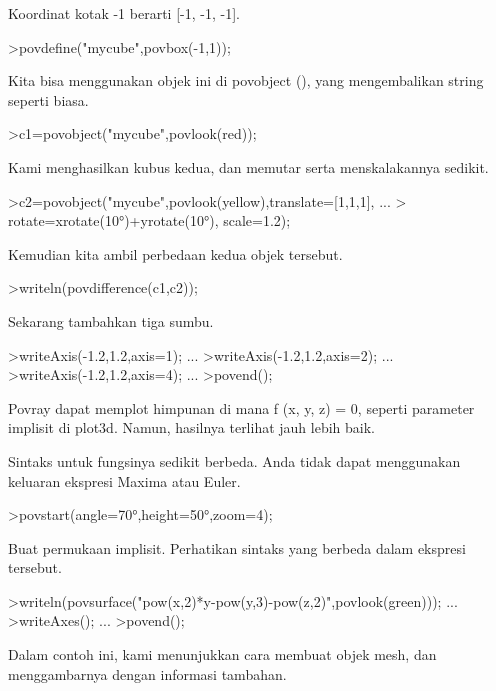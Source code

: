 \documentclass[a4paper,10pt]{article}
\begin{document}
\begin{eulernotebook}
\begin{eulercomment}
\begin{eulercomment}
\begin{eulercomment}
Koordinat kotak -1 berarti [-1, -1, -1].
\end{eulercomment}
\begin{eulerprompt}
>povdefine("mycube",povbox(-1,1));
\end{eulerprompt}
\begin{eulercomment}
Kita bisa menggunakan objek ini di povobject (), yang mengembalikan
string seperti biasa.
\end{eulercomment}
\begin{eulerprompt}
>c1=povobject("mycube",povlook(red));
\end{eulerprompt}
\begin{eulercomment}
Kami menghasilkan kubus kedua, dan memutar serta menskalakannya
sedikit.
\end{eulercomment}
\begin{eulerprompt}
>c2=povobject("mycube",povlook(yellow),translate=[1,1,1], ...
>  rotate=xrotate(10°)+yrotate(10°), scale=1.2);
\end{eulerprompt}
\begin{eulercomment}
Kemudian kita ambil perbedaan kedua objek tersebut.
\end{eulercomment}
\begin{eulerprompt}
>writeln(povdifference(c1,c2));
\end{eulerprompt}
\begin{eulercomment}
Sekarang tambahkan tiga sumbu.
\end{eulercomment}
\begin{eulerprompt}
>writeAxis(-1.2,1.2,axis=1); ...
>writeAxis(-1.2,1.2,axis=2); ...
>writeAxis(-1.2,1.2,axis=4); ...
>povend();
\end{eulerprompt}
\begin{eulercomment}
Povray dapat memplot himpunan di mana f (x, y, z) = 0, seperti
parameter implisit di plot3d. Namun, hasilnya terlihat jauh lebih
baik.

Sintaks untuk fungsinya sedikit berbeda. Anda tidak dapat menggunakan
keluaran ekspresi Maxima atau Euler.
\end{eulercomment}
\begin{eulerprompt}
>povstart(angle=70°,height=50°,zoom=4);
\end{eulerprompt}
\begin{eulercomment}
Buat permukaan implisit. Perhatikan sintaks yang berbeda dalam
ekspresi tersebut.
\end{eulercomment}
\begin{eulerprompt}
>writeln(povsurface("pow(x,2)*y-pow(y,3)-pow(z,2)",povlook(green))); ...
>writeAxes(); ...
>povend();
\end{eulerprompt}
\begin{eulercomment}
Dalam contoh ini, kami menunjukkan cara membuat objek mesh, dan
menggambarnya dengan informasi tambahan.


\end{eulercomment}
\end{eulercomment}
\end{eulercomment}
\end{eulernotebook}
\end{document}
